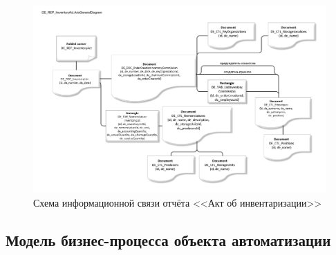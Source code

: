 \begin{figure}[!h]
    \centering

    \includegraphics[width=18cm]
    {assets/ARIS/GeneralDiagram/DE_REP_ImventoryAct.ArisGeneralDiagram.pdf}

    \caption{Схема информационной связи отчёта <<Акт об инвентаризации>>}

    \label{fig:GeneralDiagram_DE_REP_ImventoryAct}
\end{figure}




\newpage
\subsection{Модель бизнес-процесса объекта автоматизации}

